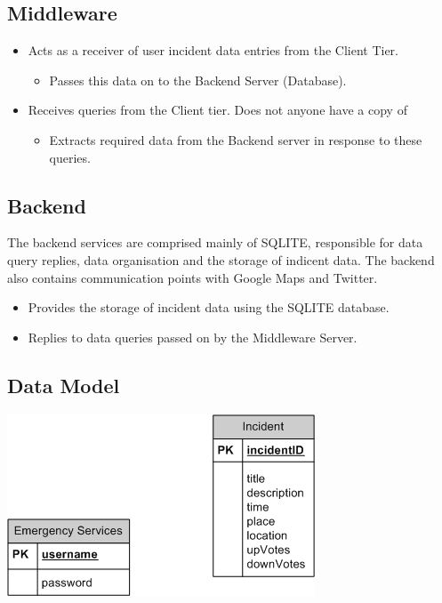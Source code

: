 \documentclass{sig-alt-release2}
\begin{document}
\subsection{Middleware}

\begin{itemize}
\item    Acts as a receiver of user incident data entries from the Client Tier.
  \begin{itemize}
  \item        Passes this data on to the Backend Server (Database).
  \end{itemize}
\item    Receives queries from the Client tier. Does not anyone have a copy of 
  \begin{itemize}
  \item        Extracts required data from the Backend server in response to these queries.
  \end{itemize}
\end{itemize}

\subsection{Backend}

The backend services are comprised mainly of SQLITE, responsible for data query replies, data organisation and the storage of indicent data. The backend also contains communication points with Google Maps and Twitter.

\begin{itemize}
\item    Provides the storage of incident data using the SQLITE database.
\item    Replies to data queries passed on by the Middleware Server.
\end{itemize}

\subsection{Data Model}

\begin{center}
  \includegraphics[scale=0.4]{img/4.png}
\end{center}
\end{document}

